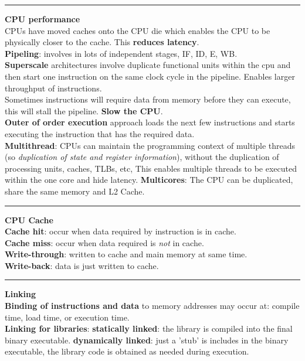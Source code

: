 \documentclass[8pt,a4paper,landscape]{article}
\newcommand{\topic}[1]{\textbf{\large #1}}
\begin{document}
\begin{spacing}{-1}
\begin{multicols*}{3}
\hrule \noindent
\topic{CPU performance} \\
CPUs have moved caches onto the CPU die which enables the CPU to be physically closer to the cache. This \textbf{reduces latency}. \\
\textbf{Pipeling}: involves in lots of independent stages, IF, ID, E, WB. \\
\textbf{Superscale} architectures involve duplicate functional units within the cpu and then start one instruction on the same clock cycle in the pipeline. Enables larger throughput of instructions. \\
Sometimes instructions will require data from memory before they can execute, this will stall the pipeline. \textbf{Slow the CPU}. \\
\textbf{Outer of order execution} approach loads the next few instructions and starts executing the instruction that has the required data. \\
\textbf{Multithread}: CPUs can maintain the programming context of multiple threads (so \textit{duplication of state and register information}), without the duplication of processing units, caches, TLBs, etc, This enables multiple threads to be executed within the one core and hide latency. 
\textbf{Multicores}: The CPU can be duplicated, share the same memory and L2 Cache.

\hrule \noindent
\topic{CPU Cache} \\
\textbf{Cache hit}: occur when data required by instruction is in cache. \\
\textbf{Cache miss}: occur when data required is \textit{not} in cache.\\
\textbf{Write-through}: written to cache and main memory at same time. \\
\textbf{Write-back}: data is just written to cache. \\

\hrule \noindent
\topic{Linking} \\
\textbf{Binding of instructions and data} to memory addresses may occur at: compile time, load time, or execution time. \\
\textbf{Linking for libraries}:
\textbf{statically linked}: the library is compiled into the final binary executable.
\textbf{dynamically linked}: just a 'stub' is includes in the binary executable, 
the library code is obtained as needed during execution.


\end{multicols*}
\end{spacing}
\end{document}
